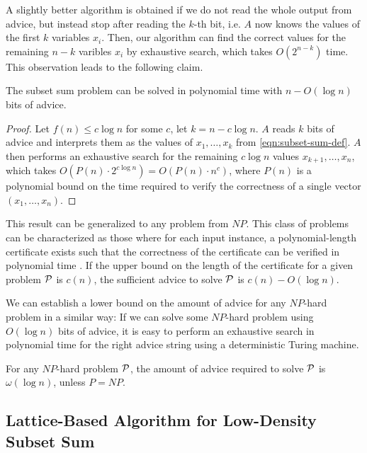 A slightly better algorithm is obtained if we do not read the whole output
from advice, but instead stop after reading the $k$-th bit, i.e. $A$ now
knows the values of the first $k$ variables $x_i$. Then, our algorithm can
find the correct values for the remaining $n-k$ varibles $x_i$ by
exhaustive search, which takes $O(2^{n-k})$ time. This observation leads
to the following claim.

\begin{theorem}\label{theorem:subset-sum-advice-upper}
    The subset sum problem can be solved in polynomial time with
    $n-O(\log{}n)$ bits of advice.
\end{theorem}

\begin{proof}
    Let $f(n) \leq c\log{}n$ for some $c$, let $k = n - c \log{}n$. $A$
    reads $k$ bits of advice and interprets them as the values of $x_1,
    \dots, x_k$ from \eqref{eqn:subset-sum-def}. $A$ then performs an
    exhaustive search for the remaining $c \log{}n$ values $x_{k+1},
    \dots, x_{n}$, which takes $O(P(n) \cdot 2^{c\log{}n}) = O(P(n) \cdot
    n^c)$, where $P(n)$ is a polynomial bound on the time required to
    verify the correctness of a single vector $(x_1, \dots, x_n)$.
\end{proof}

This result can be generalized to any problem from $NP$. This class of
problems can be characterized as those where for each input instance, a
polynomial-length certificate exists such that the correctness of the
certificate can be verified in polynomial time \cite{introduction}.  If
the upper bound on the length of the certificate for a given problem
$\mathcal{P}$ is $c(n)$, the sufficient advice to solve
$\mathcal{P}$ is $c(n) - O(\log{}n)$.

We can establish a lower bound on the amount of advice for any $NP$-hard
problem in a similar way: If we can solve some $NP$-hard problem using
$O(\log{}n)$ bits of advice, it is easy to perform an exhaustive search in
polynomial time for the right advice string using a deterministic Turing
machine.

\begin{theorem}\label{theorem:np-hard-advice-lower}
    For any $NP$-hard problem $\mathcal{P}$, the amount of advice
    required to solve $\mathcal{P}$ is $\omega(\log{}n)$, unless
    $P=NP$.
\end{theorem}

\subsection{Lattice-Based Algorithm for Low-Density Subset Sum}
\label{section:lattice-based}

